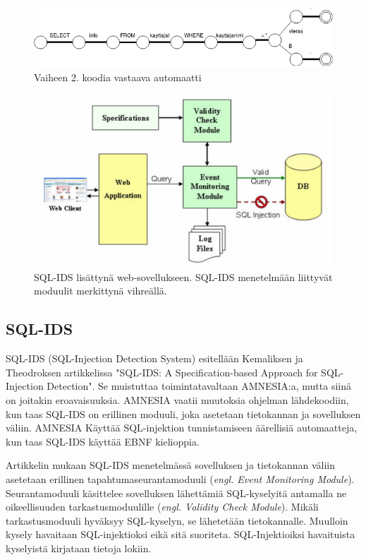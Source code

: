 \documentclass[finnish]{tktltiki2}
\theoremstyle{definition}
\theoremstyle{remark}
\begin{document}
		\begin{figure}[h!]
		\caption{Vaiheen 2. koodia vastaava automaatti}
		\includegraphics[scale=0.5]{kandi}
		\end{figure}

		\begin{figure}[b!]
			\caption{SQL-IDS lisättynä web-sovellukseen. SQL-IDS menetelmään liittyvät moduulit merkittynä vihreällä. \cite{sqlids}}
			\includegraphics[scale=0.55]{sqlids}
		\end{figure}
		
	\subsection{SQL-IDS}
	SQL-IDS (SQL-Injection Detection System) esitellään Kemaliksen ja Theodroksen artikkelissa "SQL-IDS: A Specification-based Approach for SQL-Injection Detection"\space\cite{sqlids}. Se muistuttaa toimintatavaltaan AMNESIA:a, mutta siinä on joitakin eroavaisuuksia. AMNESIA vaatii muutoksia ohjelman lähdekoodiin, kun taas SQL-IDS on erillinen moduuli, joka asetetaan tietokannan ja sovelluksen väliin. AMNESIA Käyttää SQL-injektion tunnistamiseen äärellisiä automaatteja, kun taas SQL-IDS käyttää EBNF kielioppia.
	
	Artikkelin mukaan SQL-IDS menetelmässä sovelluksen ja tietokannan väliin asetetaan erillinen tapahtumaseurantamoduuli (\textit{engl. Event Monitoring Module}). Seurantamoduuli käsittelee sovelluksen lähettämiä SQL-kyselyitä antamalla ne oikeellisuuden tarkastusmoduulille (\textit{engl. Validity Check Module}). Mikäli tarkastusmoduuli hyväksyy SQL-kyselyn, se lähetetään tietokannalle. Muulloin kysely havaitaan SQL-injektioksi eikä sitä suoriteta. SQL-Injektioiksi havaituista kyselyistä kirjataan tietoja lokiin.
	
\end{document}
